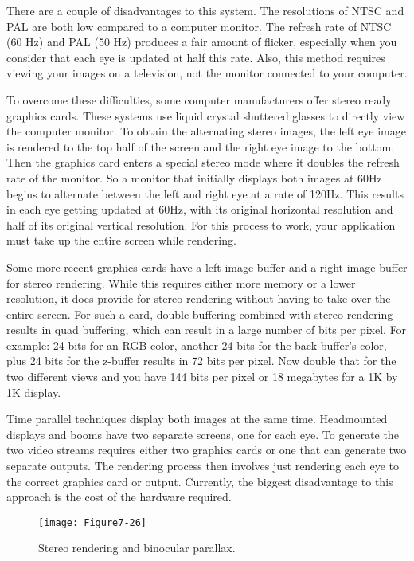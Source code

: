 There are a couple of disadvantages to this system. The resolutions of NTSC and PAL are both low compared to a computer monitor. The refresh rate of NTSC (60 Hz) and PAL (50 Hz) produces a fair amount of flicker, especially when you consider that each eye is updated at half this rate. Also, this method requires viewing your images on a television, not the monitor connected to your computer.

To overcome these difficulties, some computer manufacturers offer stereo ready graphics cards. These systems use liquid crystal shuttered glasses to directly view the computer monitor. To obtain the alternating stereo images, the left eye image is rendered to the top half of the screen and the right eye image to the bottom. Then the graphics card enters a special stereo mode where it doubles the refresh rate of the monitor. So a monitor that initially displays both images at 60Hz begins to alternate between the left and right eye at a rate of 120Hz. This results in each eye getting updated at 60Hz, with its original horizontal resolution and half of its original vertical resolution. For this process to work, your application must take up the entire screen while rendering.

Some more recent graphics cards have a left image buffer and a right image buffer for stereo rendering. While this requires either more memory or a lower resolution, it does provide for stereo rendering without having to take over the entire screen. For such a card, double buffering combined with stereo rendering results in quad buffering, which can result in a large number of bits per pixel. For example: 24 bits for an RGB color, another 24 bits for the back buffer's color, plus 24 bits for the z-buffer results in 72 bits per pixel. Now double that for the two different views and you have 144 bits per pixel or 18 megabytes for a 1K by 1K display.

Time parallel techniques display both images at the same time. Headmounted displays and booms have two separate screens, one for each eye. To generate the two video streams requires either two graphics cards or one that can generate two separate outputs. The rendering process then involves just rendering each eye to the correct graphics card or output. Currently, the biggest disadvantage to this approach is the cost of the hardware required.

\begin{figure}[!htb]
	\centering
	\texttt{[image: Figure7-26]}\\
	\caption{Stereo rendering and binocular parallax.}\label{fig:Figure7-26}
\end{figure}

